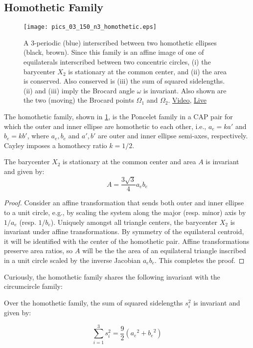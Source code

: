 \subsection{Homothetic Family}
 
\begin{figure}
    \centering
    \texttt{[image: pics\_03\_150\_n3\_homothetic.eps]}
    \caption{A 3-periodic (blue) interscribed between two homothetic ellipses (black, brown). Since this family is an affine image of one of equilaterals interscribed between two concentric circles, (i) the barycenter $X_2$ is stationary at the common center, and (ii) the area is conserved. Also conserved is (iii) the sum of squared sidelengths. (ii) and (iii) imply the Brocard angle $\omega$ is invariant. Also shown are the two (moving) the Brocard points $\Omega_1$ and $\Omega_2$. \href{https://youtu.be/2fvGd8wioZY}{Video}, \href{https://bit.ly/3aYnrVM}{Live}}
    \label{fig:03-homoth-brocard}
\end{figure}

The homothetic family, shown in \cref{fig:03-homoth-brocard}, is the Poncelet family in a CAP pair for which the outer and inner ellipse are homothetic to each other, i.e., $a_e = k a'$ and $b_e = k b'$, where $a_e,b_e$ and $a',b'$ are outer and inner ellipse semi-axes, respectively. Cayley imposes a homothecy ratio $k=1/2$.

\begin{proposition}
The barycenter $X_2$ is stationary at the common center and area $A$ is invariant and given by:
\[A= \frac{3\sqrt{3}}{4} a_e b_e \]
\end{proposition}

\begin{proof}
Consider an affine transformation that sends both outer and inner ellipse to a unit circle, e.g., by scaling the system along the major (resp. minor) axis by $1/a_e$ (resp. $1/b_e$). Uniquely amongst all triangle centers, the barycenter $X_2$ is invariant under affine transformations. By symmetry of the equilateral centroid, it will be identified with the center of the homothetic pair. Affine transformations preserve area ratios, so $A$ will be the the area of an equilateral triangle inscribed in a unit circle scaled by the inverse Jacobian $a_e b_e$. This completes the proof.
\end{proof}

Curiously, the homothetic family shares the following invariant with the circumcircle family:

\begin{proposition}
Over the homothetic family, the sum of squared sidelengths $s_i^2$ is invariant and given by:
	
\[ \sum_{i=1}^3 s_i^2=\frac{9}{2} \left({a_e}^{2}+{b_e}^{2}\right) \]
\end{proposition}

